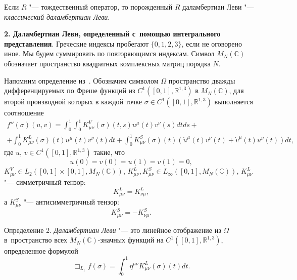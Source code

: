 Если $R$ "--- тождественный оператор, то порожденный $R$ даламбертиан Леви "--- {\it классический даламбертиан Леви}.

\smallskip



{\bf 2. Даламбертиан Леви, определенный с~помощью интегрального представления}.
Греческие индексы пробегают $\{0, 1, 2, 3\}$, если не оговорено иное. 
Мы будем суммировать по повторяющимся индексам.
Символ $M_N(\mathbb{C})$ обозначает пространство квадратных комплексных матриц порядка $N$.


%



Напомним определение из~\cite{volkov:bib:AGV}.
Обозначим символом $\Omega$  пространство  дважды дифференцируемых по Фреше функций из $C^1([0, 1],\mathbb{R}^{1,3})$ в $M_N(\mathbb{C})$,
 для второй производной которых в каждой  точке $\sigma\in C^1([0, 1],\mathbb{R}^{1,3})$
 выполняется соотношение
\begin{multline}
\label{volk:f''}
f''(\sigma)(u,v)=\int_0^1\int_0^1K^V_{\mu\nu}(\sigma)(t,s)u^{\mu}(t)v^{\nu}(s)dtds+\\
+\int_0^1K^L_{\mu\nu}(\sigma)(t)u^{\mu}(t)v^{\nu}(t)dt
+\int_0^1K^S_{\mu\nu}(\sigma)(t)(\dot{u}^{\mu}(t)v^{\nu}(t)+\dot{v}^{\mu}(t)u^{\nu}(t))dt,
\end{multline}
где  $u$, $v\in C^1([0, 1],\mathbb{R}^{1,3})$ такие, что 
$$u(0)=v(0)= u(1)=v(1)=0,$$  
$K^V_{\mu\nu}\in L_2([0, 1]\times[0, 1],M_N(\mathbb{C}))$,
$K^L_{\mu\nu},K^S_{\mu\nu}\in L_\infty([0, 1],M_N(\mathbb{C}))$,
$K^L_{\mu\nu}$  "--- симметричный тензор:
$$
K^L_{\mu\nu}=K^L_{\nu\mu},
$$
а $K^S_{\mu\nu}$ "--- антисимметричный тензор:
$$
K^S_{\mu\nu}=-K^S_{\nu\mu}.
$$

\smallskip

\hypertarget{volk:def2}{}

{\small \sc Определение 2}. {\it Даламбертиан Леви} "--- это линейное отображение из $\Omega$
в~пространство всех $M_N(\mathbb{C})$-значных функций на $C^1([0, 1],\mathbb{R}^{1,3})$, определенное формулой
$$
\Box_{L_1}f(\sigma)=\int_0^1\eta^{\mu\nu}K^L_{\mu\nu}(\sigma)(t)dt. %
$$


